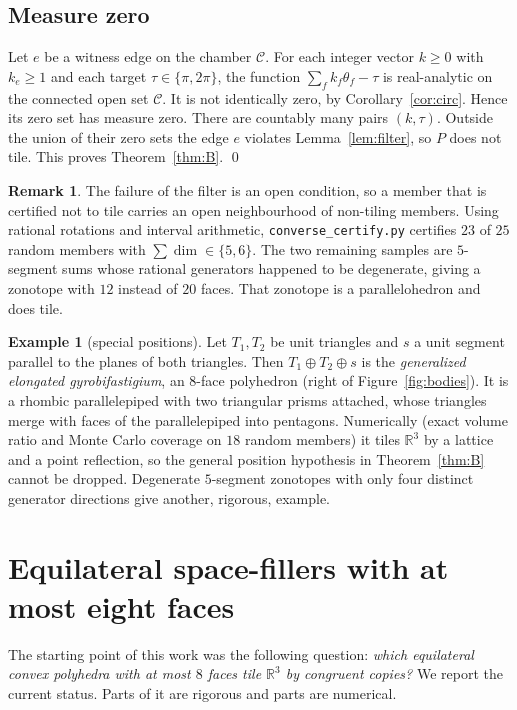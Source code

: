 \documentclass[11pt]{amsart}
\theoremstyle{definition}
\newtheorem{remark}[thm]{Remark}
\newtheorem{example}[thm]{Example}
\newcommand{\R}{\mathbb{R}}
\newcommand{\msum}{\oplus}
\begin{document}
\subsection{Measure zero}
Let $e$ be a witness edge on the chamber $\mathcal{C}$. For each integer vector $k\ge0$ with $k_e\ge1$ and each
target $\tau\in\{\pi,2\pi\}$, the function $\sum_fk_f\theta_f-\tau$ is real-analytic on the connected open set
$\mathcal C$. It is not identically zero, by Corollary~\ref{cor:circ}. Hence its zero set has measure zero. There are
countably many pairs $(k,\tau)$. Outside the union of their zero sets the edge $e$ violates
Lemma~\ref{lem:filter}, so $P$ does not tile. This proves Theorem~\ref{thm:B}. \qed

\begin{remark}
The failure of the filter is an open condition, so a member that is certified not to tile carries an open
neighbourhood of non-tiling members. Using rational rotations and interval arithmetic, \texttt{converse\_certify.py}
certifies $23$ of $25$ random members with $\sum\dim\in\{5,6\}$. The two remaining samples are $5$-segment sums whose
rational generators happened to be degenerate, giving a zonotope with $12$ instead of $20$ faces. That zonotope is a
parallelohedron and does tile.
\end{remark}

\begin{example}[special positions]\label{ex:elongated}
Let $T_1,T_2$ be unit triangles and $s$ a unit segment parallel to the planes of both triangles. Then
$T_1\msum T_2\msum s$ is the \emph{generalized elongated gyrobifastigium}, an $8$-face polyhedron (right of
Figure~\ref{fig:bodies}). It is a rhombic parallelepiped with two triangular prisms attached, whose triangles merge
with faces of the parallelepiped into pentagons. Numerically (exact volume ratio and Monte Carlo coverage on $18$
random members) it tiles $\R^3$ by a lattice and a point reflection, so the general position hypothesis in
Theorem~\ref{thm:B} cannot be dropped. Degenerate $5$-segment zonotopes with only four distinct generator directions
give another, rigorous, example.
\end{example}

\section{Equilateral space-fillers with at most eight faces}\label{sec:class}

The starting point of this work was the following question: \emph{which equilateral convex polyhedra with at
most $8$ faces tile $\R^3$ by congruent copies?} We report the current status. Parts of it are rigorous and parts are
numerical.
\end{document}
